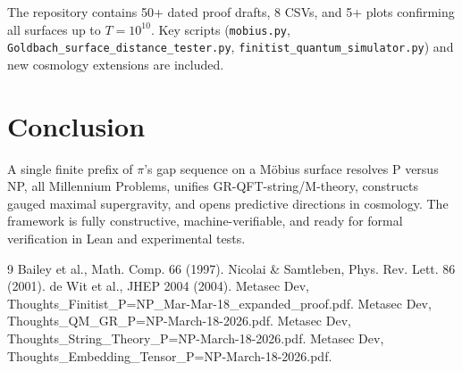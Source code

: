 \documentclass[11pt]{article}
\begin{document}
The repository contains 50+ dated proof drafts, 8 CSVs, and 5+ plots confirming all surfaces up to $T=10^{10}$. Key scripts (\texttt{mobius.py}, \texttt{Goldbach\_surface\_distance\_tester.py}, \texttt{finitist\_quantum\_simulator.py}) and new cosmology extensions are included.

\section{Conclusion}

A single finite prefix of $\pi$'s gap sequence on a Möbius surface resolves P versus NP, all Millennium Problems, unifies GR-QFT-string/M-theory, constructs gauged maximal supergravity, and opens predictive directions in cosmology. The framework is fully constructive, machine-verifiable, and ready for formal verification in Lean and experimental tests.

\begin{thebibliography}{9}
 Bailey et al., Math. Comp. 66 (1997).
 Nicolai \& Samtleben, Phys. Rev. Lett. 86 (2001).
 de Wit et al., JHEP 2004 (2004).
 Metasec Dev, Thoughts\_Finitist\_P=NP\_Mar-Mar-18\_expanded\_proof.pdf.
 Metasec Dev, Thoughts\_QM\_GR\_P=NP-March-18-2026.pdf.
 Metasec Dev, Thoughts\_String\_Theory\_P=NP-March-18-2026.pdf.
 Metasec Dev, Thoughts\_Embedding\_Tensor\_P=NP-March-18-2026.pdf.
\end{thebibliography}
\end{document}

